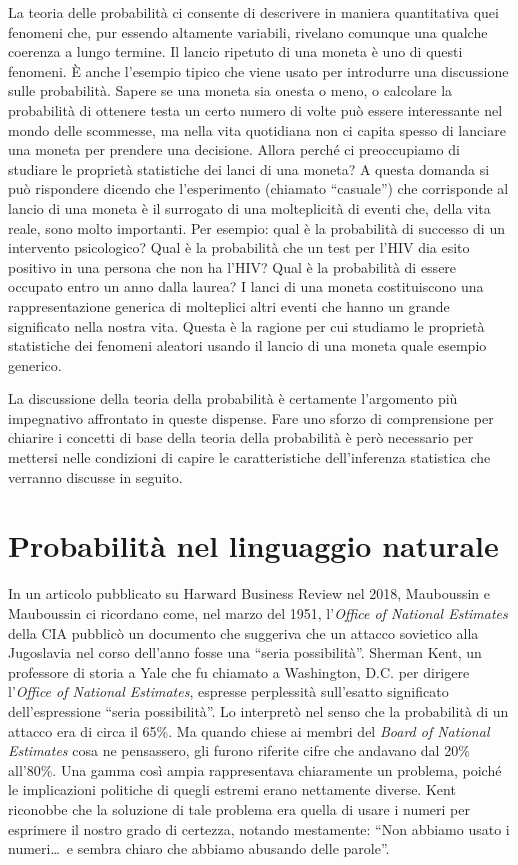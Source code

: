 La teoria delle probabilità ci consente di descrivere in maniera quantitativa quei fenomeni che, pur essendo altamente variabili, rivelano comunque una qualche coerenza a lungo termine. 
Il lancio ripetuto di una moneta è uno di questi fenomeni. 
È anche l'esempio tipico che viene usato per introdurre una discussione sulle probabilità. 
Sapere se una moneta sia onesta o meno, o calcolare la probabilità di ottenere testa un certo numero di volte può essere interessante nel mondo delle scommesse, ma nella vita quotidiana non ci capita spesso di lanciare una moneta per prendere una decisione.  
Allora perché ci preoccupiamo di studiare le proprietà statistiche dei lanci di una moneta? 
A questa domanda si può rispondere dicendo che l'esperimento (chiamato \enquote{casuale}) che corrisponde al lancio di una moneta è il surrogato di una molteplicità di eventi che, della vita reale, sono molto importanti. 
Per esempio: qual è la probabilità di successo di un intervento psicologico? 
Qual è la probabilità che un test per l'HIV dia esito positivo in una persona che non ha l'HIV? Qual è la probabilità di essere occupato entro un anno dalla laurea? 
I lanci di una moneta costituiscono una rappresentazione generica di molteplici altri eventi che hanno un grande significato nella nostra vita. 
Questa è la ragione per cui  studiamo le proprietà statistiche dei fenomeni aleatori usando il lancio di una moneta quale esempio generico.

La discussione della teoria della probabilità è certamente l'argomento più impegnativo affrontato in queste dispense. 
Fare uno sforzo di comprensione per chiarire i concetti di base della teoria della probabilità è però necessario per mettersi nelle condizioni di capire le caratteristiche dell'inferenza statistica che verranno discusse in seguito.


\section{Probabilità nel linguaggio naturale}

In un articolo pubblicato su Harward Business Review nel 2018, Mauboussin e Mauboussin ci ricordano come, nel marzo del 1951, l'\emph{Office of National Estimates} della CIA pubblicò un documento che suggeriva che un attacco sovietico alla Jugoslavia nel corso dell'anno fosse una \enquote{seria possibilità}. 
Sherman Kent, un professore di storia a Yale che fu chiamato a Washington, D.C. per dirigere l'\emph{Office of National Estimates}, espresse perplessità sull'esatto significato dell'espressione \enquote{seria possibilità}. 
Lo interpretò nel senso che la probabilità di un attacco era di circa il 65\%. 
Ma quando chiese ai membri del \emph{Board of National Estimates} cosa ne pensassero, gli furono riferite cifre che andavano dal 20\% all'80\%. 
Una gamma così ampia rappresentava chiaramente un problema, poiché le implicazioni politiche di quegli estremi erano nettamente diverse. 
Kent riconobbe che la soluzione di tale problema era quella di usare i numeri per esprimere il nostro grado di certezza, notando mestamente: \enquote{Non abbiamo usato i numeri\dots\, e sembra chiaro che abbiamo abusando delle parole}.

